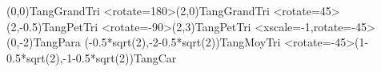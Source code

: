 \documentclass{standalone}
\begin{document}
\begin{EnvTangramTikz}
    \PieceTangram[TangSol]({0},{0}){TangGrandTri}                                                   %
    \PieceTangram[TangSol]<rotate=180>({2},{0}){TangGrandTri}                             %
    \PieceTangram[TangSol]<rotate=45>({2},{-0.5}){TangPetTri}                                %
    \PieceTangram[TangSol]<rotate=-90>({2},{3}){TangPetTri}                                   %
    \PieceTangram[TangSol]<xscale=-1,rotate=-45>({0},{-2}){TangPara}                   %
    \PieceTangram[TangSol]({-0.5*sqrt(2)},{-2-0.5*sqrt(2)}){TangMoyTri}                   %
    \PieceTangram[TangSol]<rotate=-45>({1-0.5*sqrt(2)},{-1-0.5*sqrt(2)}){TangCar} %
\end{EnvTangramTikz}
\end{document}
